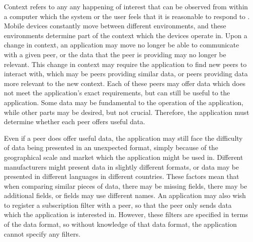 \documentclass[12pt,twoside,notitlepage]{report}
\begin{document}
Context refers to any any happening of interest that can be observed from within a computer which the system or the user feels that it is reasonable to respond to \cite{muhl2006distributed}. 
Mobile devices constantly move between different environments, and these environments determine part of the context which the devices operate in. 
Upon a change in context, an application may move no longer be able to communicate with a given peer, or the data that the peer is providing may no longer be relevant. 
This change in context may require the application to find new peers to interact with, which may be peers providing similar data, or peers providing data more relevant to the new context. 
Each of these peers may offer data which does not meet the application's exact requirements, but can still be useful to the application. 
Some data may be fundamental to the operation of the application, while other parts may be desired, but not crucial. 
Therefore, the application must determine whether each peer offers useful data. 

Even if a peer does offer useful data, the application may still face the difficulty of data being presented in an unexpected format, simply because of the geographical scale and market which the application might be used in. 
Different manufacturers might present data in slightly different formats, or data may be presented in different languages in different countries. 
These factors mean that when comparing similar pieces of data, there may be missing fields, there may be additional fields, or fields may use different names. 
An application may also wish to register a subscription filter with a peer, so that the peer only sends data which the application is interested in. 
However, these filters are specified in terms of the data format, so without knowledge of that data format, the application cannot specify any filters.
\end{document}
